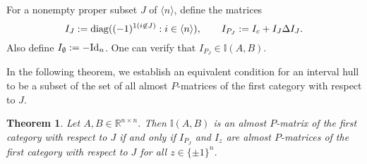 \documentclass[11pt]{article}
\newtheorem{theorem}{Theorem}[section]
\begin{document}
For a nonempty proper subset $J$ of  $\langle n \rangle$, define the
matrices
\begin{equation}
I_J := {\rm diag}((-1)^{1 (i \not\in J)} : i \in \langle n \rangle), \qquad
I_{P_J}:=I_c + I_J \Delta I_J.
\end{equation}
Also define $I_\emptyset := -{\rm Id}_n$. One can verify that  $I_{P_J}
\in \mathbb{I}(A,B)$.

In the following theorem, we establish  an equivalent condition  for an interval hull to be a subset of the set of all almost $P$-matrices of the first category with respect to $J$.  
\begin{theorem}\label{almost p 1st hull}
 Let $A,B \in \mathbb{R}^{n \times n}$. Then $\mathbb{I}(A,B)$ is an almost $P$-matrix of the first category with respect to $J$ if and only if $I_{P_J}$ and $I_z$ are almost $P$-matrices  of the first category with respect to $J$ for all $z\in \{ \pm 1 \}^n$.
\end{theorem}
\end{document}
